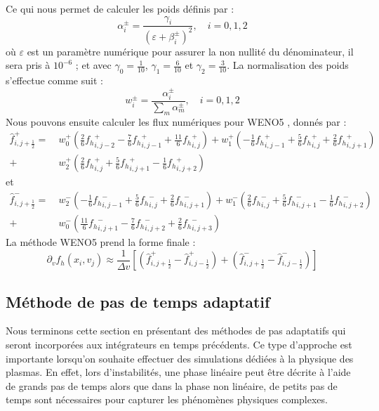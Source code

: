 Ce qui nous permet de calculer les poids définis par :
$$
  \alpha_i^\pm = \frac{\gamma_i}{(\varepsilon + \beta_i^\pm)^2},\quad i=0,1,2
$$
où $\varepsilon$ est un paramètre numérique pour assurer la non nullité du dénominateur, il sera pris à $10^{-6}$ ; et avec $\gamma_0=\frac{1}{10}$, $\gamma_1=\frac{6}{10}$ et $\gamma_2=\frac{3}{10}$. La normalisation des poids s'effectue comme suit :
$$
  w_i^\pm = \frac{\alpha_i^\pm}{\sum_m \alpha_m^\pm},\quad i=0,1,2
$$
Nous pouvons ensuite calculer les flux numériques pour WENO5 \cite{Shu:2003}, donnés par :
$$
  \begin{aligned}
    \hat{f}_{i,j+\frac{1}{2}}^+   =\ & w_0^+\left(  \frac{2}{6}\left.f_h\right.^+_{i,j-2} - \frac{7}{6}\left.f_h\right.^+_{i,j-1} + \frac{11}{6}\left.f_h\right.^+_{i,j}   \right)
                                  +    w_1^+\left( -\frac{1}{6}\left.f_h\right.^+_{i,j-1} + \frac{5}{6}\left.f_h\right.^+_{i,j}   +  \frac{2}{6}\left.f_h\right.^+_{i,j+1} \right) \\
                                  +  & w_2^+\left(  \frac{2}{6}\left.f_h\right.^+_{i,j}   + \frac{5}{6}\left.f_h\right.^+_{i,j+1} -  \frac{1}{6}\left.f_h\right.^+_{i,j+2} \right)
  \end{aligned}
$$
et
$$
  \begin{aligned}
    \hat{f}_{i,j+\frac{1}{2}}^-   =\ & w_2^-\left( -\frac{1}{6}\left.f_h\right.^-_{i,j-1} + \frac{5}{6}\left.f_h\right.^-_{i,j}   + \frac{2}{6}\left.f_h\right.^-_{i,j+1} \right)
                                  +    w_1^-\left(  \frac{2}{6}\left.f_h\right.^-_{i,j}   + \frac{5}{6}\left.f_h\right.^-_{i,j+1} - \frac{1}{6}\left.f_h\right.^-_{i,j+2} \right) \\
                                  +  & w_0^-\left( \frac{11}{6}\left.f_h\right.^-_{i,j+1} - \frac{7}{6}\left.f_h\right.^-_{i,j+2} + \frac{2}{6}\left.f_h\right.^-_{i,j+3} \right)
  \end{aligned}
$$
La méthode WENO5 prend la forme finale :
$$
  \partial_vf_h(x_i,v_j) \approx \frac{1}{\Delta v}\left[ \left(\hat{f}_{i,j+\frac{1}{2}}^+ - \hat{f}_{i,j-\frac{1}{2}}^+ \right) + \left(\hat{f}_{i,j+\frac{1}{2}}^- - \hat{f}_{i,j-\frac{1}{2}}^- \right) \right]
$$

\subsection{Méthode de pas de temps adaptatif}\label{ssec:dtadapt}

Nous terminons cette section en présentant des méthodes de pas adaptatifs qui seront incorporées aux intégrateurs en temps précédents. Ce type d'approche est importante lorsqu'on souhaite effectuer des simulations dédiées à la physique des plasmas. En effet, lors d'instabilités, une phase linéaire peut être décrite à l'aide de grands pas de temps alors que dans la phase non linéaire, de petits pas de temps sont nécessaires pour capturer les phénomènes physiques complexes. 

